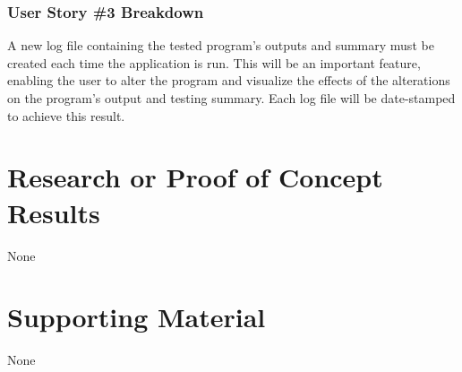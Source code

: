 \subsubsection{User Story \#3 Breakdown}
A new log file containing the tested program's outputs and summary must be created each time the application is run.
This will be an important feature, enabling the user to alter the program and visualize the effects of the alterations on
the program's output and testing summary.  Each log file will be date-stamped to achieve this result.


\section{Research or Proof of Concept Results}
None


\section{Supporting Material}
None

